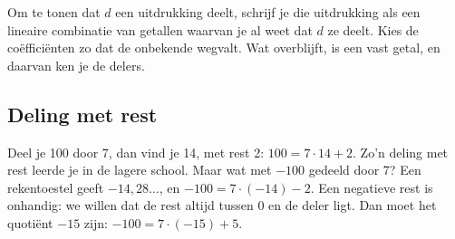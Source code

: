 \begin{werkwijze}
Om te tonen dat $d$ een uitdrukking deelt, schrijf je die uitdrukking als een lineaire combinatie van getallen waarvan je al weet dat $d$ ze deelt. Kies de coëfficiënten zo dat de onbekende wegvalt. Wat overblijft, is een vast getal, en daarvan ken je de delers.
\end{werkwijze}


\begin{oefeningen}
\end{oefeningen}

\subsection{Deling met rest}

Deel je 100 door 7, dan vind je 14, met rest 2: $100 = 7 \cdot 14 + 2$. Zo'n deling met rest leerde je in de lagere school. Maar wat met $-100$ gedeeld door 7? Een rekentoestel geeft $-14{,}28\ldots$, en $-100 = 7 \cdot (-14) - 2$. Een negatieve rest is onhandig: we willen dat de rest altijd tussen 0 en de deler ligt. Dan moet het quotiënt $-15$ zijn: $-100 = 7 \cdot (-15) + 5$.


